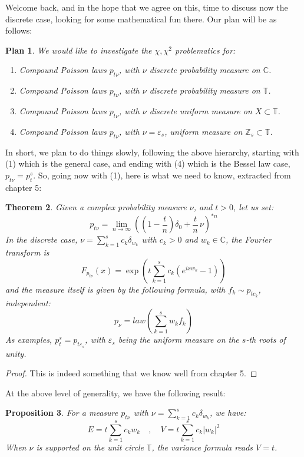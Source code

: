 \documentclass[12pt]{amsbook}
\newtheorem{theorem}{Theorem}[chapter]
\newtheorem{plan}[theorem]{Plan}
\newtheorem{proposition}[theorem]{Proposition}
\begin{document}
Welcome back, and in the hope that we agree on this, time to discuss now the discrete case, looking for some mathematical fun there. Our plan will be as follows:

\begin{plan}
We would like to investigate the $\chi,\chi^2$ problematics for:
\begin{enumerate}
\item Compound Poisson laws $p_{t\nu}$, with $\nu$ discrete probability measure on $\mathbb C$.

\item Compound Poisson laws $p_{t\nu}$, with $\nu$ discrete probability measure on $\mathbb T$.

\item Compound Poisson laws $p_{t\nu}$, with $\nu$ discrete uniform measure on $X\subset\mathbb T$.

\item Compound Poisson laws $p_{t\nu}$, with $\nu=\varepsilon_s$, uniform measure on $\mathbb Z_s\subset\mathbb T$.
\end{enumerate}
\end{plan}

In short, we plan to do things slowly, following the above hierarchy, starting with (1) which is the general case, and ending with (4) which is the Bessel law case, $p_{t\nu}=p^s_t$. So, going now with (1), here is what we need to know, extracted from chapter 5:

\begin{theorem}
Given a complex probability measure $\nu$, and $t>0$, let us set:
$$p_{t\nu}=\lim_{n\to\infty}\left(\left(1-\frac{t}{n}\right)\delta_0+\frac{t}{n}\,\nu\right)^{*n}$$
In the discrete case, $\nu=\sum_{k=1}^sc_k\delta_{w_k}$ with $c_k>0$ and $w_k\in\mathbb C$, the Fourier transform is
$$F_{p_{t\nu}}(x)=\exp\left(t\sum_{k=1}^sc_k(e^{ixw_k}-1)\right)$$
and the measure itself is given by the following formula, with $f_k\sim p_{tc_k}$, independent:
$$p_\nu=law\left(\sum_{k=1}^sw_kf_k\right)$$
As examples, $p_t^s=p_{t\varepsilon_s}$, with $\varepsilon_s$ being the uniform measure on the $s$-th roots of unity.
\end{theorem}

\begin{proof}
This is indeed something that we know well from chapter 5.
\end{proof}

At the above level of generality, we have the following result:

\begin{proposition}
For a measure $p_{t\nu}$ with $\nu=\sum_{k=1}^sc_k\delta_{w_k}$, we have:
$$E=t\sum_{k=1}^sc_kw_k\quad,\quad V=t\sum_{k=1}^sc_k|w_k|^2$$
When $\nu$ is supported on the unit circle $\mathbb T$, the variance formula reads $V=t$.
\end{proposition}
\end{document}
